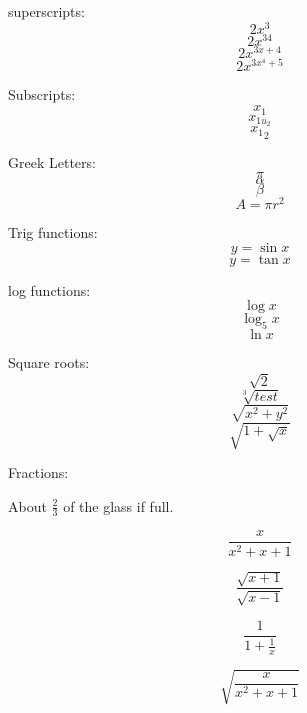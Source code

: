 \documentclass{article}
\begin{document}
superscripts: 
$$2x^3$$
$$2x^{34}$$
$$2x^{3x+4}$$
$$2x^{3x^4+5}$$

Subscripts:
$$x_1$$
$$x_{1u_2}$$
$${x_1}_2$$


Greek Letters:
$$\pi$$
$$\alpha$$
$$\beta$$
$$A=\pi r^2$$

Trig functions:
$$y=\sin{x}$$
$$y=\tan{x}$$

log functions:
$$\log{x}$$
$$\log_5{x}$$
$$\ln{x}$$

Square roots:
$$\sqrt{2}$$
$$\sqrt[3]{test}$$
$$\sqrt{x^2+y^2}$$
$$\sqrt{1+\sqrt{x}}$$

Fractions:

About $\displaystyle{\frac{2}{3}}$ of the glass if full.

$$\frac{x}{x^2+x+1}$$

$$\frac{\sqrt{x+1}}{\sqrt{x-1}}$$

$$\frac{1}{1+\frac{1}{x}}$$

$$\sqrt{\frac{x}{x^2+x+1}}$$
\end{document}
